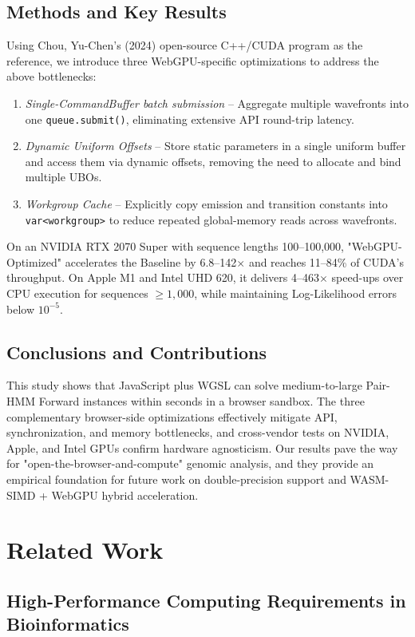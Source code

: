 \documentclass[PhD]{PHlab-thesis}
\begin{document}
\section{Methods and Key Results}
Using Chou, Yu-Chen's (2024) open-source C++/CUDA program as the reference, we introduce three WebGPU-specific optimizations to address the above bottlenecks:
\begin{enumerate}
    \item \emph{Single-CommandBuffer batch submission} – Aggregate multiple wavefronts into one \texttt{queue.submit()}, eliminating extensive API round-trip latency.
    \item \emph{Dynamic Uniform Offsets} – Store static parameters in a single uniform buffer and access them via dynamic offsets, removing the need to allocate and bind multiple UBOs.
    \item \emph{Workgroup Cache} – Explicitly copy emission and transition constants into \texttt{var<workgroup>} to reduce repeated global-memory reads across wavefronts.
\end{enumerate}
On an NVIDIA RTX 2070 Super with sequence lengths 100–100,000, "WebGPU-Optimized" accelerates the Baseline by 6.8–142$\times$ and reaches 11–84\% of CUDA’s throughput. On Apple M1 and Intel UHD 620, it delivers 4–463$\times$ speed-ups over CPU execution for sequences $\geq 1,000$, while maintaining Log-Likelihood errors below $10^{-5}$.

\section{Conclusions and Contributions}
This study shows that JavaScript plus WGSL can solve medium-to-large Pair-HMM Forward instances within seconds in a browser sandbox. The three complementary browser-side optimizations effectively mitigate API, synchronization, and memory bottlenecks, and cross-vendor tests on NVIDIA, Apple, and Intel GPUs confirm hardware agnosticism. Our results pave the way for "open-the-browser-and-compute" genomic analysis, and they provide an empirical foundation for future work on double-precision support and WASM-SIMD + WebGPU hybrid acceleration.


\chapter{Related Work}
\section{High-Performance Computing Requirements in Bioinformatics}
\end{document}
